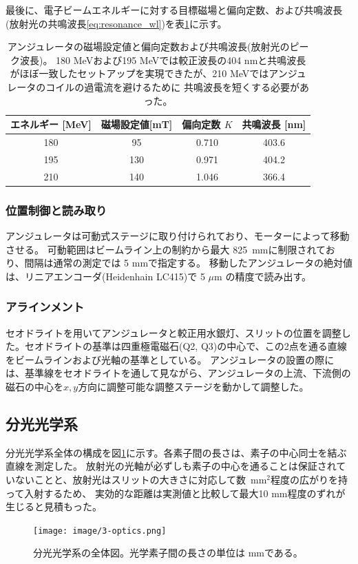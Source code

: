 \documentclass[a4paper,11pt,uplatex]{jsbook}
\begin{document}
最後に、電子ビームエネルギーに対する目標磁場と偏向定数、および共鳴波長(放射光の共鳴波長\ref{eq:resonance_wl})を表\ref{undulator_setting}に示す。
\begin{table}
  \centering
  \begin{tabular}{c|ccc}
    エネルギー [MeV]& 磁場設定値[mT]&偏向定数 $K$&共鳴波長 [nm]\\ \hline
    180 & 95  & 0.710 & 403.6\\
    195 & 130 & 0.971 & 404.2\\
    210 & 140 & 1.046 & 366.4\\
  \end{tabular}
  \caption[アンジュレータの磁場設定値]{アンジュレータの磁場設定値と偏向定数および共鳴波長(放射光のピーク波長)。
  180 MeVおよび195 MeVでは較正波長の404 nmと共鳴波長がほぼ一致したセットアップを実現できたが、210 MeVではアンジュレータのコイルの過電流を避けるために
  共鳴波長を短くする必要があった。}\label{undulator_setting}
\end{table}

\subsubsection{位置制御と読み取り}
アンジュレータは可動式ステージに取り付けられており、モーターによって移動させる。
可動範囲はビームライン上の制約から最大 825~mmに制限されており、間隔は通常の測定では 5 mmで指定する。
移動したアンジュレータの絶対値は、リニアエンコーダ(Heidenhain LC415)で 5 $\mu \text{m}$ の精度で読み出す。

\subsubsection{アラインメント}
セオドライトを用いてアンジュレータと較正用水銀灯、スリットの位置を調整した。セオドライトの基準は四重極電磁石(Q2, Q3)の中心で、この2点を通る直線をビームラインおよび光軸の基準としている。
アンジュレータの設置の際には、基準線をセオドライトを通して見ながら、アンジュレータの上流、下流側の磁石の中心を$x,y$方向に調整可能な調整ステージを動かして調整した。

\subsection{分光光学系}
分光光学系全体の構成を図\ref{fig:optics}に示す。各素子間の長さは、素子の中心同士を結ぶ直線を測定した。
放射光の光軸が必ずしも素子の中心を通ることは保証されていないことと、放射光はスリットの大きさに対応して数~mm$^2$程度の広がりを持って入射するため、
実効的な距離は実測値と比較して最大10 mm程度のずれが生じると見積もった。
\begin{figure}[h]
  \centering
  \texttt{[image: image/3-optics.png]}\\
  \caption[分光光学系の全体図]{分光光学系の全体図。光学素子間の長さの単位は mmである。}
  \label{fig:optics}
\end{figure}
\end{document}
